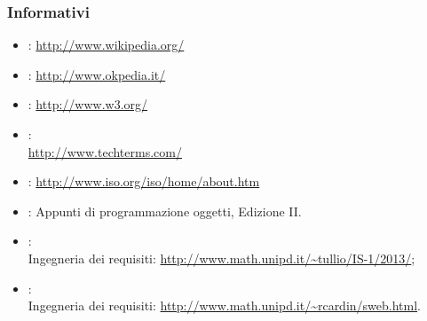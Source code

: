 \subsubsection{Informativi} %
\label{1.4.2}
\begin{itemize}
\item {}: \url{ http://www.wikipedia.org/}
\item {}: \url{ http://www.okpedia.it/}
\item {}: \url{http://www.w3.org/}
\item {}:\\ \url{http://www.techterms.com/}
\item {}: \url{http://www.iso.org/iso/home/about.htm}
\item {}: Appunti di programmazione oggetti, Edizione II.\\
\item {}:\\
Ingegneria dei requisiti: \url{http://www.math.unipd.it/~tullio/IS-1/2013/};
\item {}:\\
Ingegneria dei requisiti: \url{http://www.math.unipd.it/~rcardin/sweb.html}.
\end{itemize}








